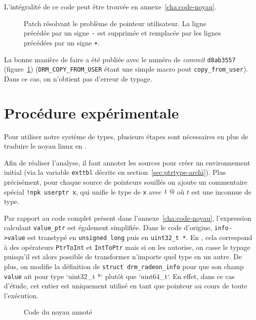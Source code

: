 L'intégralité de ce code peut être trouvée en annexe~\ref{cha:code-noyau}.

\begin{figure}

  \caption[Patch résolvant le problème de pointeur utilisateur.]
      {Patch résolvant le problème de pointeur utilisateur.
       La ligne précédée par un signe \texttt{-} est supprimée et remplacée
       par les lignes précédées par un signe \texttt{+}.
      }
\label{fig:linux-patch}
\end{figure}

La bonne manière de faire a été publiée avec le numéro de \emph{commit}
\texttt{d8ab3557} (figure~\ref{fig:linux-patch}) (\texttt{DRM\_COPY\_FROM\_USER}
étant une simple macro pout \texttt{copy\_from\_user}). Dans ce cas, on
n'obtient pas d'erreur de typage.

\section{Procédure expérimentale}
\label{sec:demo-unif}

Pour utiliser notre système de types, plusieurs étapes sont nécessaires en plus
de traduire le noyau linux en \langname{}.

Afin de réaliser l'analyse, il faut annoter les sources pour créer un
environnement initial (via la variable \texttt{exttbl} décrite en
section~\ref{sec:ptrtype-archi}). Plus précisément, pour chaque source de
pointeurs souillés on ajoute un commentaire spécial \texttt{!npk userptr x}, qui
unifie le type de \texttt{x} avec $t~@$ où $t$ est une inconnue de type.

Par rapport au code complet présent dans l'annexe~\ref{cha:code-noyau},
l'expression calculant \texttt{value_ptr} est également simplifiée. Dans le code
d'origine, \texttt{info->value} est transtypé en \texttt{unsigned long} puis en
\texttt{uint32\_t *}. En \newspeak, cela correspond à des opérateurs
\texttt{PtrToInt} et \texttt{IntToPtr} mais si on les autorise, on casse le
typage puisqu'il est alors possible de transformer n'importe quel type en un
autre. De plus, on modifie la définition de
\texttt{struct drm\_radeon\_info} pour que son champ \texttt{value} ait pour
type `uint32_t *` plutôt que `uint64_t`. En effet, dans ce cas d'étude, cet
entier est uniquement utilisé en tant que pointeur au cours de toute
l'exécution.

\begin{figure}

\caption{Code du noyau annoté}
\label{fig:ex-drm}
\end{figure}

